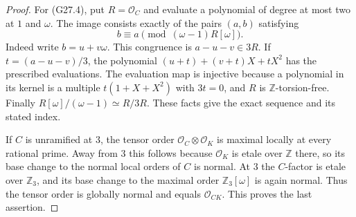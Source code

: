 \begin{proof}
For (G27.4), put $R=\mathcal O_C$ and evaluate a polynomial
of degree at most two at $1$ and $\omega$.
The image consists exactly of the pairs $(a,b)$ satisfying
\[
              b\equiv a\pmod{(\omega-1)R[\omega]}.
\]
Indeed write $b=u+v\omega$.  This congruence is
$a-u-v\in3R$.  If $t=(a-u-v)/3$, the polynomial
$(u+t)+(v+t)X+tX^2$ has the prescribed evaluations.
The evaluation map is injective because a polynomial in its
kernel is a multiple $t(1+X+X^2)$ with $3t=0$, and $R$ is
$\mathbb Z$-torsion-free.  Finally
$R[\omega]/(\omega-1)\simeq R/3R$.
These facts give the exact sequence and its stated index.

If $C$ is unramified at $3$, the tensor order
$\mathcal O_C\otimes\mathcal O_K$ is maximal locally
at every rational prime.  Away from $3$ this follows because
$\mathcal O_K$ is etale over $\mathbb Z$ there, so its
base change to the normal local orders of $C$ is normal.
At $3$ the $C$-factor is etale over $\mathbb Z_3$, and
its base change to the maximal order $\mathbb Z_3[\omega]$
is again normal.  Thus the tensor order is globally normal
and equals $\mathcal O_{CK}$.  This proves the last assertion.
\end{proof}


